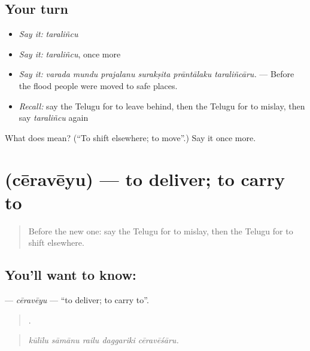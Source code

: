 \subsection*{Your turn}
\begin{itemize}
\raggedright
  \item \emph{Say it:} \emph{taraliñcu}
  \item \emph{Say it:} \emph{taraliñcu}, once more
  \item \emph{Say it:} \emph{varada mundu prajalanu surakṣita prāntālaku taraliñcāru.} — Before the flood people were moved to safe places.
  \item \emph{Recall:} say the Telugu for to leave behind, then the Telugu for to mislay, then say \emph{taraliñcu} again
\end{itemize}

\begin{tcolorbox}[breakable,colback=teal!4,colframe=teal!35!black,title={Before you move on}]
What does  mean? (\textquotedblleft{}To shift elsewhere; to move\textquotedblright{}.) Say it once more.
\end{tcolorbox}
\section[\texorpdfstring{\te{చేరవేయు} (cēravēyu)}{చేరవేయు (cēravēyu)}]{ (cēravēyu) — to deliver; to carry to}

\label{lesson:TE-C461-ceraveyu}



\begin{quote}
Before the new one: say the Telugu for to mislay, then the Telugu for to shift elsewhere.
\end{quote}

\subsection*{You'll want to know: }
\textbf{} — \emph{cēravēyu} — \textquotedblleft{}to deliver; to carry to\textquotedblright{}.

\begin{quote}
    .
\end{quote}

\begin{quote}
\emph{kūlīlu sāmānu railu daggariki cēravēśāru.}
\end{quote}

